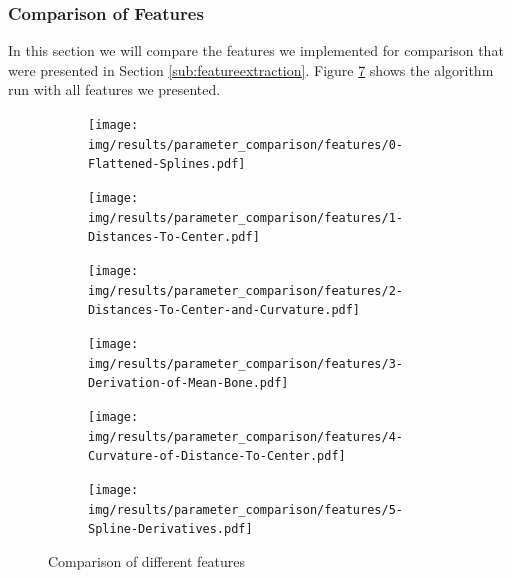 \documentclass[pdftex,12pt,a4paper]{report}
\begin{document}
\subsubsection{Comparison of Features}

In this section we will compare the features we implemented for comparison that were presented in Section \ref{sub:featureextraction}. Figure \ref{fig:features} shows the algorithm run with all features we presented.

\begin{figure}[h]
	\centering
	\begin{subfigure}[b]{0.32\textwidth}
		\centering
		\texttt{[image: img/results/parameter\_comparison/features/0-Flattened-Splines.pdf]}
		\label{fig:features-0}
	\end{subfigure}
	\begin{subfigure}[b]{0.32\textwidth}
		\centering
		\texttt{[image: img/results/parameter\_comparison/features/1-Distances-To-Center.pdf]}
		\label{fig:features-1}
	\end{subfigure}
	\begin{subfigure}[b]{0.32\textwidth}
		\centering
		\texttt{[image: img/results/parameter\_comparison/features/2-Distances-To-Center-and-Curvature.pdf]}
		\label{fig:features-2}
	\end{subfigure}
	\begin{subfigure}[b]{0.32\textwidth}
		\centering
		\texttt{[image: img/results/parameter\_comparison/features/3-Derivation-of-Mean-Bone.pdf]}
		\label{fig:features-3}
	\end{subfigure}
	\begin{subfigure}[b]{0.32\textwidth}
		\centering
		\texttt{[image: img/results/parameter\_comparison/features/4-Curvature-of-Distance-To-Center.pdf]}
		\label{fig:features-4}
	\end{subfigure}
	\begin{subfigure}[b]{0.32\textwidth}
		\centering
		\texttt{[image: img/results/parameter\_comparison/features/5-Spline-Derivatives.pdf]}
		\label{fig:features-5}
	\end{subfigure}
	\caption{Comparison of different features}
	\label{fig:features}
\end{figure}
\end{document}
